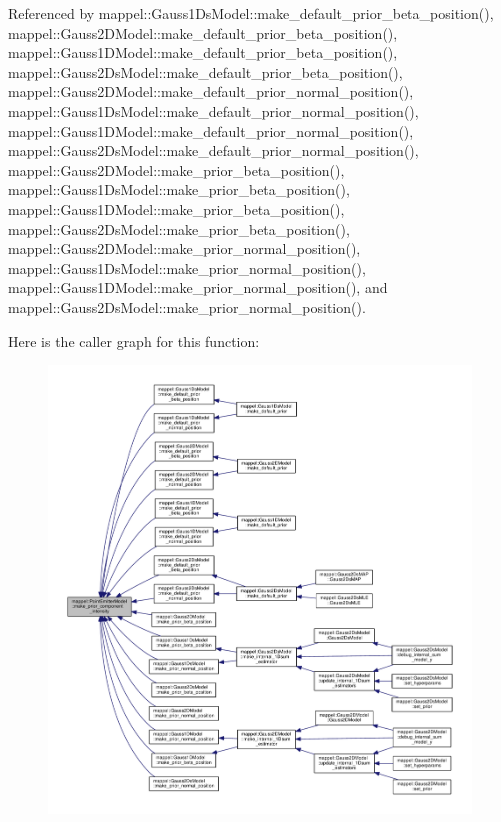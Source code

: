 Referenced by mappel\+::\+Gauss1\+Ds\+Model\+::make\+\_\+default\+\_\+prior\+\_\+beta\+\_\+position(), mappel\+::\+Gauss2\+D\+Model\+::make\+\_\+default\+\_\+prior\+\_\+beta\+\_\+position(), mappel\+::\+Gauss1\+D\+Model\+::make\+\_\+default\+\_\+prior\+\_\+beta\+\_\+position(), mappel\+::\+Gauss2\+Ds\+Model\+::make\+\_\+default\+\_\+prior\+\_\+beta\+\_\+position(), mappel\+::\+Gauss2\+D\+Model\+::make\+\_\+default\+\_\+prior\+\_\+normal\+\_\+position(), mappel\+::\+Gauss1\+Ds\+Model\+::make\+\_\+default\+\_\+prior\+\_\+normal\+\_\+position(), mappel\+::\+Gauss1\+D\+Model\+::make\+\_\+default\+\_\+prior\+\_\+normal\+\_\+position(), mappel\+::\+Gauss2\+Ds\+Model\+::make\+\_\+default\+\_\+prior\+\_\+normal\+\_\+position(), mappel\+::\+Gauss2\+D\+Model\+::make\+\_\+prior\+\_\+beta\+\_\+position(), mappel\+::\+Gauss1\+Ds\+Model\+::make\+\_\+prior\+\_\+beta\+\_\+position(), mappel\+::\+Gauss1\+D\+Model\+::make\+\_\+prior\+\_\+beta\+\_\+position(), mappel\+::\+Gauss2\+Ds\+Model\+::make\+\_\+prior\+\_\+beta\+\_\+position(), mappel\+::\+Gauss2\+D\+Model\+::make\+\_\+prior\+\_\+normal\+\_\+position(), mappel\+::\+Gauss1\+Ds\+Model\+::make\+\_\+prior\+\_\+normal\+\_\+position(), mappel\+::\+Gauss1\+D\+Model\+::make\+\_\+prior\+\_\+normal\+\_\+position(), and mappel\+::\+Gauss2\+Ds\+Model\+::make\+\_\+prior\+\_\+normal\+\_\+position().



Here is the caller graph for this function\+:\nopagebreak
\begin{figure}[H]
\begin{center}
\leavevmode
\includegraphics[width=350pt]{classmappel_1_1PointEmitterModel_a4517e887a22007bd2e03650dcb853c92_icgraph}
\end{center}
\end{figure}


